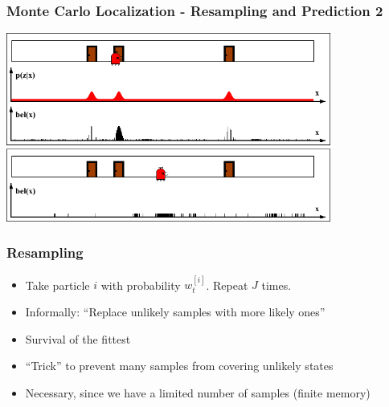 \begin{frame}
    \frametitle{Monte Carlo Localization - Resampling and Prediction 2}
    
    \begin{center} 
        \includegraphics[width=0.8\textwidth]{./images/particle_filter/monte_carlo_resample_and_predict2.pdf} 
    \end{center}
    
\end{frame}

\begin{frame}
    \frametitle{Resampling}

    \begin{itemize}
        \item Take particle $i$ with probability $w_t^{[i]}$. Repeat $J$ times.
        \item Informally: ``Replace unlikely samples with more likely ones''
        \item Survival of the fittest
        \item ``Trick'' to prevent many samples from covering unlikely states
        \item Necessary, since we have a limited number of samples (finite memory)
    \end{itemize}
\end{frame}


